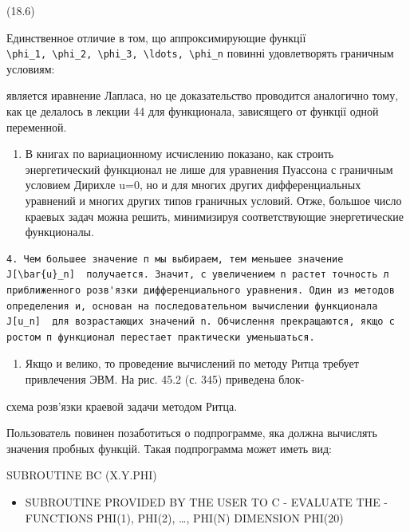 \documentclass[
  ukrainian,
]{article}
\providecommand{\tightlist}{%
  \setlength{\itemsep}{0pt}\setlength{\parskip}{0pt}}
\begin{document}
(18.6)

Единственное отличие в том, що аппроксимирующие функції
\texttt{\textbackslash{}phi\_1,\ \textbackslash{}phi\_2,\ \textbackslash{}phi\_3,\ \textbackslash{}ldots,\ \textbackslash{}phi\_n}
повинні удовлетворять граничным условиям:

является иравнение Лапласа, но це доказательство проводится аналогично
тому, как це делалось в лекции 44 для функционала, зависящего от функції
одной переменной.

\begin{enumerate}
\def\labelenumi{\arabic{enumi}.}
\setcounter{enumi}{2}
\tightlist
\item
  В книгах по вариационному исчислению показано, как строить
  энергетический функционал не лише для уравнения Пуассона с граничным
  условием Дирихле u=0, но и для многих других дифференциальных
  уравнений и многих других типов граничных условий. Отже, большое число
  краевых задач можна решить, минимизируя соответствующие энергетические
  функционалы.
\end{enumerate}

\begin{verbatim}
4. Чем большее значение п мы выбираем, тем меньшее значение  J[\bar{u}_n]  получается. Значит, с увеличением n растет точность л приближенного розв'язки дифференциального уравнения. Один из методов определения и, основан на последовательном вычислении функционала  J[u_n]  для возрастающих значений n. Обчислення прекращаются, якщо с ростом п функционал перестает практически уменьшаться.
\end{verbatim}

\begin{enumerate}
\def\labelenumi{\arabic{enumi}.}
\setcounter{enumi}{4}
\tightlist
\item
  Якщо и велико, то проведение вычислений по методу Ритца требует
  привлечения ЭВМ. На рис. 45.2 (с. 345) приведена блок-
\end{enumerate}

схема розв'язки краевой задачи методом Ритца.

Пользователь повинен позаботиться о подпрограмме, яка должна вычислять
значения пробных функцій. Такая подпрограмма может иметь вид:

SUBROUTINE BC (X.Y.PHI)

\begin{itemize}
\tightlist
\item
  SUBROUTINE PROVIDED BY THE USER TO C - EVALUATE THE - FUNCTIONS
  PHI(1), PHI(2), \ldots, PHI(N) DIMENSION PHI(20)
\end{itemize}
\end{document}
